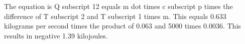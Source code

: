 The equation is Q subscript 12 equals m dot times c subscript p times the difference of T subscript 2 and T subscript 1 times m. This equals 0.633 kilograms per second times the product of 0.063 and 5000 times 0.0036. This results in negative 1.39 kilojoules.